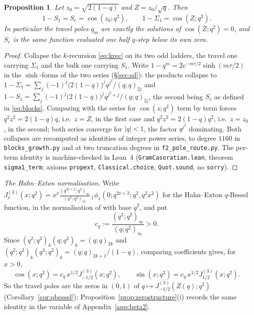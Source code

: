 \documentclass[11pt]{article}
\theoremstyle{plain}
\newtheorem{proposition}[theorem]{Proposition}
\theoremstyle{definition}
\theoremstyle{remark}
\begin{document}
\begin{proposition}\label{prop:qtrig}
Let $z_0=\sqrt{2(1-q)}$ and $Z=z_0/\sqrt q$. Then
\[
   1-S_1=S_e=\cos(z_0;q^2),\qquad 1-\Sigma_1=\cos(Z;q^2).
\]
In particular the travel poles $q_m$ are exactly the solutions of $\cos(Z;q^2)=0$, and $S_e$ is the
same function evaluated one half $q$-step below its own zero.
\end{proposition}

\begin{proof}
Collapse the $k$-recursion \eqref{eq:krec} on its two odd ladders, the travel one carrying
$\Sigma_1$ and the bulk one carrying $S_1$. Write $1-q^m=2e^{-m\tau/2}\sinh(m\tau/2)$ in the
$\sinh$-forms of the two series
(\S\ref{sec:sd}): the products collapse to
$1-\Sigma_1=\sum_j(-1)^j\bigl(2(1-q)\bigr)^jq^{j^2}/(q;q)_{2j}$ and
$1-S_1=\sum_j(-1)^j\bigl(2(1-q)\bigr)^jq^{j^2+j}/(q;q)_{2j}$, the second being $S_e$ as defined in
\eqref{eq:blocks}. Comparing with the series for
$\cos(z;q^2)$ term by term forces $q^2z^2=2(1-q)q$, i.e.\ $z=Z$, in the first case and
$q^2z^2=2(1-q)q^2$, i.e.\ $z=z_0$, in the second; both series converge for $|q|<1$, the factor
$q^{j^2}$ dominating. Both collapses are recomputed as identities of integer power series, to
degree $1160$ in \texttt{blocks\_growth.py} and at two truncation degrees in
\texttt{f2\_pole\_route.py}. The per-term identity is machine-checked in Lean~4
(\texttt{GramCasoratian.lean}, theorem \texttt{sigma1\_term}; axioms \texttt{propext},
\texttt{Classical.choice}, \texttt{Quot.sound}, no \texttt{sorry}).
\end{proof}

\noindent\emph{The Hahn--Exton normalisation.} Write
$J^{(3)}_\nu(x;q^2)=x^\nu\frac{(q^{2\nu+2};q^2)_\infty}{(q^2;q^2)_\infty}\,
{}_1\phi_1(0;q^{2\nu+2};q^2,q^2x^2)$ for the Hahn--Exton $q$-Bessel function, in the
normalisation of \cite[eq.~(2.4)]{KoelinkSwarttouw1994} with base $q^2$, and put
\[
   c_q:=\frac{(q^2;q^2)_\infty}{(q;q^2)_\infty}>0 .
\]
Since $(q^2;q^2)_k(q;q^2)_k=(q;q)_{2k}$ and $(q^2;q^2)_k(q^3;q^2)_k=(q;q)_{2k+1}/(1-q)$, comparing
coefficients gives, for $x>0$,
\[
   \cos(x;q^2)=c_q\,x^{1/2}J^{(3)}_{-1/2}(x;q^2),\qquad
   \sin(x;q^2)=c_q\,x^{1/2}J^{(3)}_{1/2}(x;q^2).
\]
So the travel poles are the zeros in $(0,1)$ of $q\mapsto J^{(3)}_{-1/2}(Z(q);q^2)$
(Corollary~\ref{cor:qbessel}); Proposition~\ref{prop:zerostructure}(i) records the same identity in
the variable of Appendix~\ref{app:beta2}.
\end{document}
